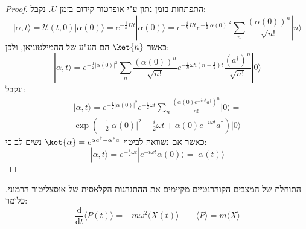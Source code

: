 \documentclass{tstextbook}
\begin{document}
\begin{proof}
התפתחות בזמן נתון ע"י אופרטור קידום בזמן \(U\). נקבל:
$$|\alpha,t\rangle={\mathcal{U}}(t,0)|\alpha(0)\rangle=e^{-{\frac{i}{\hbar}}H t}|\alpha(0)\rangle=e^{-{\frac{i}{\hbar}}H t}e^{-{\frac{1}{2}}|\alpha(0)|^{2}}\sum_{n}{\frac{(\alpha(0))^{n}}{\sqrt{n!}}}|n\rangle$$
כאשר \(\ket{n}\) הם הע"ע של ההמילטוניאן, ולכן:
$$|\alpha,t\rangle=e^{-{\frac{1}{2}}|\alpha(0)|^{2}}\sum_{n}{\frac{(\alpha(0))^{n}}{\sqrt{n!}}}e^{-{\frac{i}{\hbar}}\omega\hbar(n+{\frac{1}{2}})t}{\frac{(a^{\dagger})^{n}}{\sqrt{n!}}}|0\rangle$$
ונקבל:
$$\begin{array}{c}{{\vert\alpha,t\rangle=e^{-\frac{1}{2}\vert\alpha(0)\vert^{2}}e^{-\frac{i}{2}\omega t}\sum_{n}\frac{(\alpha(0)e^{-i\omega t}a^{\dagger})^{n}}{n!}\vert0\rangle=}}\\ {{\exp{\left(-\frac{1}{2}\vert\alpha(0)\vert^{2}-\frac{i}{2}\omega t+\alpha(0)e^{-i\omega t}a^{\dagger}\right)}\vert0\rangle}}\end{array}$$
כאשר אם נשוואה לביטוי \(\ket{\alpha}=e^{ \alpha a^{\dagger}-\alpha^{*}a }\)  נשים לב כי:
$$|\alpha,t\rangle=e^{-{\frac{i}{2}}\omega t}|e^{-i\omega t}\alpha(0)\rangle=|\alpha(t)\rangle$$

\end{proof}
\begin{proposition}
התוחלת של המצבים הקוהרנטיים מקיימים את ההתנהגות הקלאסית של אוסצליטור הרמוני. כלומר:
$$\frac{\mathrm{d} }{\mathrm{d} t} \langle P(t) \rangle =-m\omega^{2}\langle X(t) \rangle \qquad \langle P \rangle =m \langle X \rangle  $$

\end{proposition}
\end{document}
